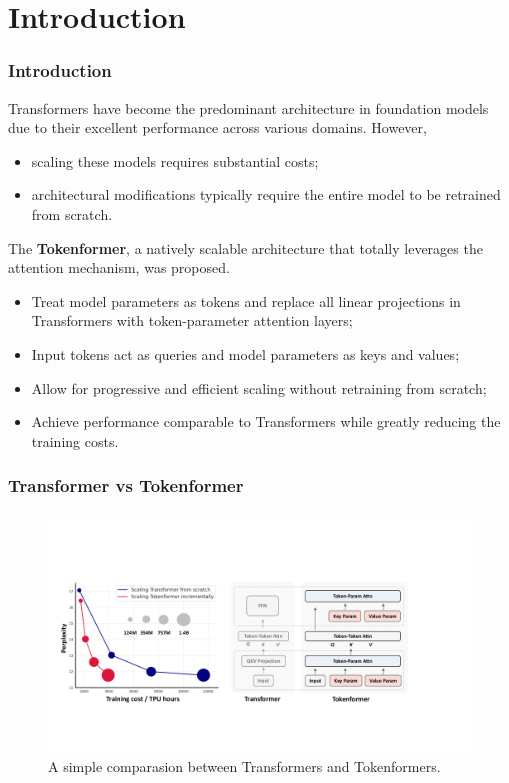 \section{Introduction}
\begin{frame}
\frametitle{Introduction}
Transformers have become the predominant architecture
in foundation models due to their excellent performance
across various domains. However,
\begin{itemize}
    \item scaling these models requires substantial costs;
    \item architectural modifications typically require the entire
    model to be retrained from scratch.
\end{itemize}
The \textbf{Tokenformer}, a natively scalable architecture that totally
leverages the attention mechanism, was proposed.
\begin{itemize}
    \item Treat model parameters as tokens and replace all linear
    projections in Transformers with token-parameter attention layers;
    \item Input tokens act as queries and model parameters as keys
    and values;
    \item Allow for progressive and efficient scaling without retraining
    from scratch;
    \item Achieve performance comparable to Transformers while
    greatly reducing the training costs.
\end{itemize}
\end{frame}

\begin{frame}
\frametitle{Transformer vs Tokenformer}
\begin{figure}[h]
    \centering
    \includegraphics[width=0.99\linewidth]{./transformer-paper/intro_v4.pdf}
    \vspace{-0.1cm}
    \caption{A simple comparasion between Transformers and Tokenformers.}
    \label{fig:intro_figure}
    \vspace{-6pt}
\end{figure}
\end{frame}
